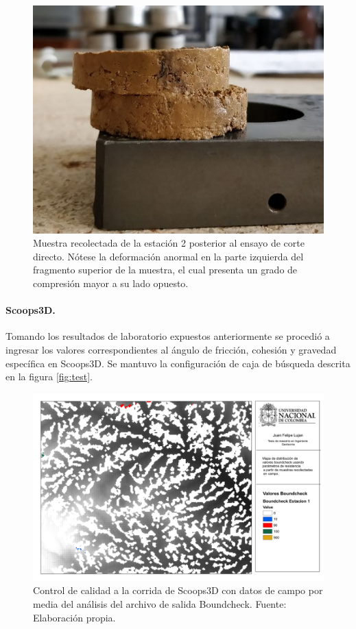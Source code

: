 \begin{figure}[H]
\centering
\includegraphics[scale=1]{img/est2.jpg}
\caption{Muestra recolectada de la estaci\'on 2 posterior al ensayo de corte directo. N\'otese la deformaci\'on anormal en la parte izquierda del fragmento superior de la muestra, el cual presenta un grado de compresi\'on mayor a su lado opuesto.}
\label{fig:toma-bloque}
\end{figure}


\paragraph{Scoops3D.}
Tomando los resultados de laboratorio expuestos anteriormente se procedi\'o a ingresar los valores correspondientes al \'angulo de fricci\'on, cohesi\'on y gravedad espec\'ifica en Scoops3D. Se mantuvo la configuraci\'on de caja de b\'usqueda descrita en la figura \ref{fig:test}.

\begin{figure}[H]
\centering
\includegraphics[scale=0.3]{img/boundcheckCampo.pdf}
\caption{Control de calidad a la corrida de Scoops3D con datos de campo por media del an\'alisis del archivo de salida Boundcheck. Fuente: Elaboraci\'on propia.}
\label{fig:dem usado}
\end{figure}

